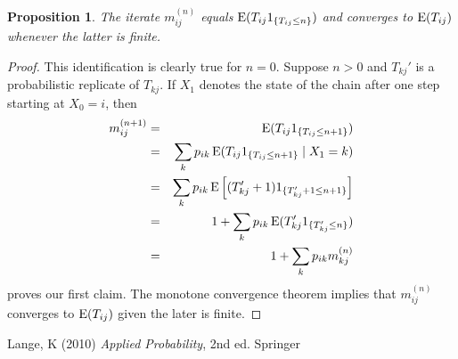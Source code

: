 \documentclass[11pt]{article}
\newtheorem{proposition}{Proposition}[section]
\def\E{\mathop{\rm E\,\!}\nolimits}
\begin{document}
\begin{proposition}
The iterate $m_{ij}^{(n)}$ equals $\E(T_{ij}1_{\{T_{ij}\le n\}})$
and converges to $\E(T_{ij})$ whenever the latter is finite.
\end{proposition}
\begin{proof}
This identification is clearly true for $n=0$. Suppose $n>0$ and $T_{kj}'$ is a probabilistic replicate of $T_{kj}$. If $X_1$ denotes the state of the
chain after one step starting at $X_0=i$, then
\begin{eqnarray*}
m_{ij}^{(n+1)} & = & \E(T_{ij}1_{\{T_{ij}\le n+1\}}) \\
& = & \sum_{k} p_{ik} 
\E(T_{ij}1_{\{T_{ij}\le n+1\}} \mid X_1 = k) \\
& = & \sum_{k} p_{ik} 
\E\Big[(T_{kj}'+1)1_{\{T_{kj}'+1\le n+1\}}\Big] \\
& = & 1+ \sum_{k} p_{ik}\E(T_{kj}'1_{\{T_{kj}'\le n\}})\\
& = & 1+ \sum_{k} p_{ik}m_{kj}^{(n)}
\end{eqnarray*}
proves our first claim. The monotone convergence theorem implies that 
$m_{ij}^{(n)}$ converges to $\E(T_{ij})$ given the later is finite.
\end{proof} 


\begin{thebibliography}{99}
Lange, K (2010) {\it Applied Probability}, 2nd ed. Springer
\end{thebibliography}
\end{document}
